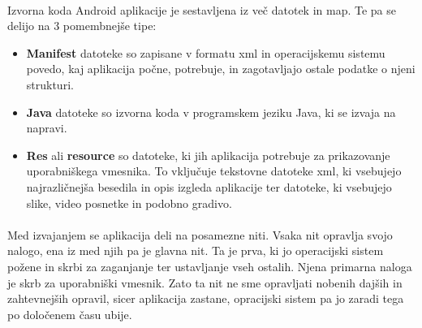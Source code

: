 \paragraph{}Izvorna koda Android aplikacije je sestavljena iz več datotek in map. Te pa se delijo na 3 pomembnejše tipe:
\begin{itemize}
  \setlength\itemsep{0em}
  \item {\bf Manifest} datoteke so zapisane v formatu xml in operacijskemu sistemu povedo, kaj aplikacija počne, potrebuje, in zagotavljajo ostale podatke o njeni strukturi.
  \item {\bf Java} datoteke so izvorna koda v programskem jeziku Java, ki se izvaja na napravi.
  \item {\bf Res} ali {\bf resource} so datoteke, ki jih aplikacija potrebuje za prikazovanje uporabniškega vmesnika. To vključuje tekstovne datoteke xml, ki vsebujejo najrazličnejša besedila in opis izgleda aplikacije ter datoteke, ki vsebujejo slike, video posnetke in podobno gradivo.
\end{itemize}

\paragraph{}Med izvajanjem se aplikacija deli na posamezne niti. Vsaka nit opravlja svojo nalogo, ena iz med njih pa je glavna nit. Ta je prva, ki jo operacijski sistem požene in skrbi za zaganjanje ter ustavljanje vseh ostalih. Njena primarna naloga je skrb za uporabniški vmesnik. Zato ta nit ne sme opravljati nobenih dajših in zahtevnejših opravil, sicer aplikacija zastane, opracijski sistem pa jo zaradi tega po določenem času ubije.
